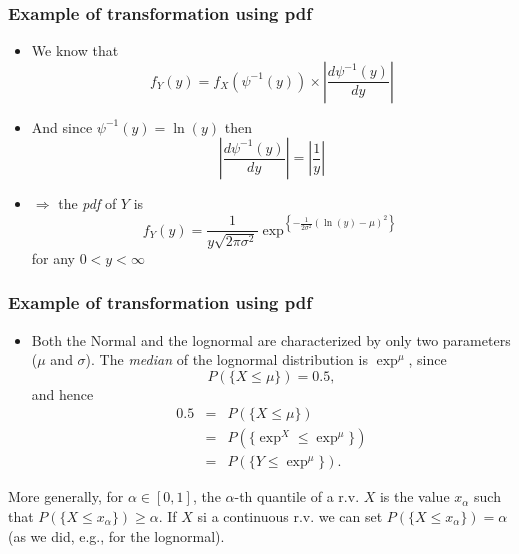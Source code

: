 \documentclass[notes=show,smaller,handout]{beamer}
\renewcommand{\Pr}{P}
\newenvironment{stepitemize}{\begin{itemize}[<+->]}{\end{itemize} }
\begin{document}
\begin{frame}%

\frametitle{Example of transformation using pdf}
\begin{example}[cont'd]
\begin{stepitemize}
\item We know that 
\begin{equation*}
f_{Y}\left( y\right) =f_{X}\left( \psi ^{-1}\left( y\right) \right) \times
\left\vert \frac{d\psi ^{-1}\left( y\right) }{dy}\right\vert
\end{equation*}

\item And since $\psi ^{-1}\left( y\right) =\ln (y)$ then 
\begin{equation*}
\left\vert \frac{d\psi ^{-1}\left( y\right) }{dy}\right\vert =\left\vert 
\frac{1}{y}\right\vert
\end{equation*}

\item $\Rightarrow $ the \emph{pdf} of $Y$ is 
\begin{equation*}
f_{Y}\left( y\right) =\frac{1}{y\sqrt{2\pi \sigma ^{2}}}\exp^{ \left\{ -\frac{1%
}{2\sigma ^{2}}\left( \ln (y)-\mu \right) ^{2}\right\}}
\end{equation*}%
for any $0<y<\infty $
\end{stepitemize}
\end{example}
\end{frame}

\begin{frame}

\frametitle{Example of transformation using pdf}
\begin{example}[cont'd]
\begin{stepitemize}
\item Both the Normal and the lognormal are characterized by
only two parameters ($\mu$ and $\sigma$). The \emph{median} of the lognormal distribution is $\exp^{
\mu } $, since $$
\Pr \left( \{ X\leq \mu \} \right) = 0.5, 
$$
and hence%
\begin{eqnarray*}
0.5 &=&\Pr \left(\{ X\leq \mu \}\right) \\
&=&\Pr \left( \{\exp^{X} \leq \exp^{ \mu }\} \right) \\
&=&\Pr \left( \{Y\leq \exp^{ \mu }\} \right).
\end{eqnarray*}
\end{stepitemize}
\end{example}
More generally, for $\alpha\in[0,1]$, the $\alpha$-th quantile of a r.v. $X$ is the value $x_\alpha$ such that $P(\{X \leq x_\alpha\})\geq\alpha$. If $X$ si a continuous r.v.  we can set $P(\{X \leq x_\alpha\})=\alpha$ (as we did, e.g., for the lognormal).
\end{frame}
\end{document}
